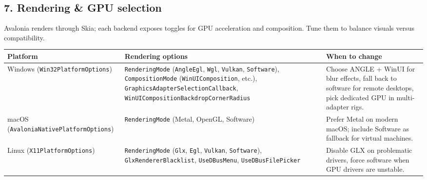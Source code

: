 \subsection{7. Rendering \& GPU
selection}\label{rendering-gpu-selection}

Avalonia renders through Skia; each backend exposes toggles for GPU
acceleration and composition. Tune them to balance visuals versus
compatibility.

\begin{longtable}[]{@{}
  >{\raggedright\arraybackslash}p{}
  >{\raggedright\arraybackslash}p{}
  >{\raggedright\arraybackslash}p{}@{}}
\toprule\noalign{}
\begin{minipage}[b]{\linewidth}\raggedright
Platform
\end{minipage} & \begin{minipage}[b]{\linewidth}\raggedright
Rendering options
\end{minipage} & \begin{minipage}[b]{\linewidth}\raggedright
When to change
\end{minipage} \\
\midrule\noalign{}
\endhead
\bottomrule\noalign{}
\endlastfoot
Windows (\passthrough{\lstinline!Win32PlatformOptions!}) &
\passthrough{\lstinline!RenderingMode!}
(\passthrough{\lstinline!AngleEgl!}, \passthrough{\lstinline!Wgl!},
\passthrough{\lstinline!Vulkan!}, \passthrough{\lstinline!Software!}),
\passthrough{\lstinline!CompositionMode!}
(\passthrough{\lstinline!WinUIComposition!}, etc.),
\passthrough{\lstinline!GraphicsAdapterSelectionCallback!},
\passthrough{\lstinline!WinUICompositionBackdropCornerRadius!} & Choose
ANGLE + WinUI for blur effects, fall back to software for remote
desktops, pick dedicated GPU in multi-adapter rigs. \\
macOS (\passthrough{\lstinline!AvaloniaNativePlatformOptions!}) &
\passthrough{\lstinline!RenderingMode!} (Metal, OpenGL, Software) &
Prefer Metal on modern macOS; include Software as fallback for virtual
machines. \\
Linux (\passthrough{\lstinline!X11PlatformOptions!}) &
\passthrough{\lstinline!RenderingMode!} (\passthrough{\lstinline!Glx!},
\passthrough{\lstinline!Egl!}, \passthrough{\lstinline!Vulkan!},
\passthrough{\lstinline!Software!}),
\passthrough{\lstinline!GlxRendererBlacklist!},
\passthrough{\lstinline!UseDBusMenu!},
\passthrough{\lstinline!UseDBusFilePicker!} & Disable GLX on problematic
drivers, force software when GPU drivers are unstable. \\
\end{longtable}

